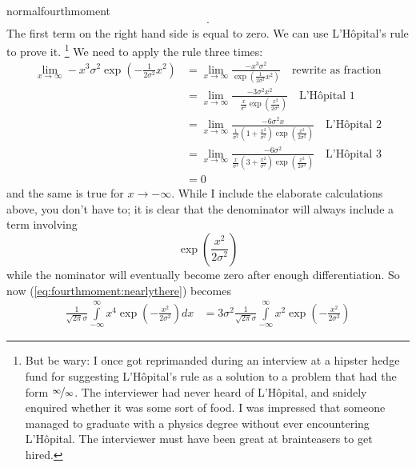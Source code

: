 \begin{answer}{normalfourthmoment}
\begin{equation}
\begin{aligned}
{}
\text{.}
\end{aligned}
\end{equation}
The first term on the right hand side is equal to zero.
We can use L'Hôpital's rule to prove it.%
\footnote{But be wary:
I once got reprimanded during an interview at a hipster hedge fund for suggesting
L'Hôpital's rule as a solution to a problem that had the form $\nicefrac{\infty}{\infty}$.
The interviewer had never heard of L'Hôpital, and snidely enquired whether it was some sort of food.
I was impressed that someone managed to graduate with a physics degree without ever encountering L'Hôpital.
The interviewer must have been great at brainteasers to get hired.}
We need to apply the rule three times:
\begin{equation}
\label{eq:fourthmoment:lhopital}
\begin{aligned}
\lim_{x \rightarrow \infty}
-x^3
\sigma^2
\exp{\left( -\frac{1}{2\sigma^2} x^2 \right)}
&=
\lim_{x \rightarrow \infty}
\frac{-x^3 \sigma^2 }{ \exp{\left( \frac{1}{2\sigma^2} x^2 \right)} }
\quad\text{rewrite as fraction}
\\
&=
\lim_{x \rightarrow \infty}
\frac{
  - 3 \sigma^{2} x^{2}
  }{
  \quad \frac{x}{\sigma^{2}} \exp{\left(\frac{x^{2}}{2 \sigma^{2}}\right)}
  }
\quad\text{L'Hôpital 1}
\\
&=
\lim_{x \rightarrow \infty}
\frac{ - 6 \sigma^{2} x }{
\frac{1 }{\sigma^{2}} \left(1 + \frac{x^{2}}{\sigma^{2}}\right)
\exp{\left(\frac{x^{2}}{2 \sigma^{2}}\right)}
}
\quad\text{L'Hôpital 2}
\\
&=
\lim_{x \rightarrow \infty}
\frac{ - 6 \sigma^{2} }{
\frac{x}{\sigma^{4}} \left(3 + \frac{x^{2}}{\sigma^{2}}\right)
\exp{\left(\frac{x^{2}}{2 \sigma^{2}}\right)}
}
\quad\text{L'Hôpital 3}
\\
&= 0
\end{aligned}
\end{equation}
and the same is true for
${x \rightarrow -\infty}$.
While I include the elaborate calculations above, you don't have to; it is clear that the denominator will always include a term involving
\[
\exp{\left(\frac{x^{2}}{2 \sigma^{2}}\right)}
\]
while the nominator will eventually become zero after enough differentiation.
So now (\ref{eq:fourthmoment:nearlythere}) becomes
\begin{align*}
\frac{1}{\sqrt{2 \pi} \sigma }
\int\limits_{-\infty}^{\infty}{
  x^4
  \exp{\left( -\frac{x^2}{2\sigma^2}  \right)}
  dx
}
&=
3 \sigma^2
\frac{1}{\sqrt{2 \pi} \sigma }
\int\limits_{-\infty}^{\infty}{
  x^2
  \exp{\left( -\frac{x^2}{2\sigma^2}  \right)}
}
\end{align*}
\end{answer}
